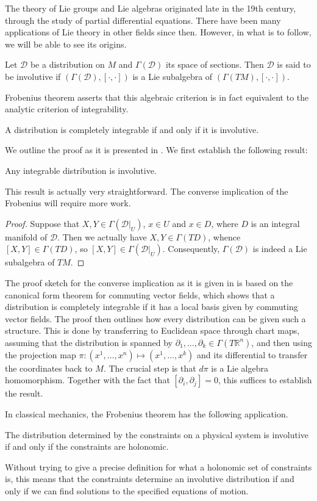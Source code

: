 The theory of Lie groups and Lie algebras originated late in the 19th century, through the study of partial differential equations. There have been many applications of Lie theory in other fields since then. However, in what is to follow, we will be able to see its origins.
\begin{definition}
  Let $\mathcal{D}$ be a distribution on $M$ and $\Gamma(\mathcal{D})$ its space of sections. Then $\mathcal{D}$ is said to be involutive if $(\Gamma(\mathcal{D}),[\cdot,\cdot])$ is a Lie subalgebra of $(\Gamma(TM),[\cdot,\cdot])$.
\end{definition}
Frobenius theorem asserts that this algebraic criterion is in fact equivalent to the analytic criterion of integrability.
\begin{theorem}
  A distribution is completely integrable if and only if it is involutive.
\end{theorem}
We outline the proof as it is presented in \cite{book:lee}. We first establish the following result:
\begin{proposition}
  Any integrable distribution is involutive.
\end{proposition}
This result is actually very straightforward. The converse implication of the Frobenius will require more work.
\begin{proof}
  Suppose that $X,Y\in\Gamma(\mathcal{D}|_U)$, $x\in U$ and $x\in D$, where $D$ is an integral manifold of $\mathcal{D}$. Then we actually have $X,Y\in\Gamma(TD)$, whence $[X,Y]\in\Gamma(TD)$, so $[X,Y]\in\Gamma(\mathcal{D}|_U)$. Consequently, $\Gamma(\mathcal{D})$ is indeed a Lie subalgebra of $TM$.
\end{proof}
The proof sketch for the converse implication as it is given in \cite[Theorem 19.12]{book:lee} is based on the canonical form theorem for commuting vector fields, which shows that a distribution is completely integrable if it has a local basis given by commuting vector fields. The proof then outlines how every distribution can be given such a structure. This is done by transferring to Euclidean space through chart maps, assuming that the distribution is spanned by $\partial_1,\dots,\partial_k\in\Gamma(T\mathbb{R}^n)$, and then using the projection map $\pi:(x^1,\dots,x^n)\mapsto (x^1,\dots, x^k)$ and its differential to transfer the coordinates back to $M$. The crucial step is that $d\pi$ is a Lie algebra homomorphism. Together with the fact that $[\partial_i,\partial_j]=0$, this suffices to establish the result.\par
In classical mechanics, the Frobenius theorem has the following application.
\begin{corollary}
  The distribution determined by the constraints on a physical system is involutive if and only if the constraints are holonomic.
\end{corollary}
Without trying to give a precise definition for what a holonomic set of constraints is, this means that the constraints determine an involutive distribution if and only if we can find solutions to the specified equations of motion.

